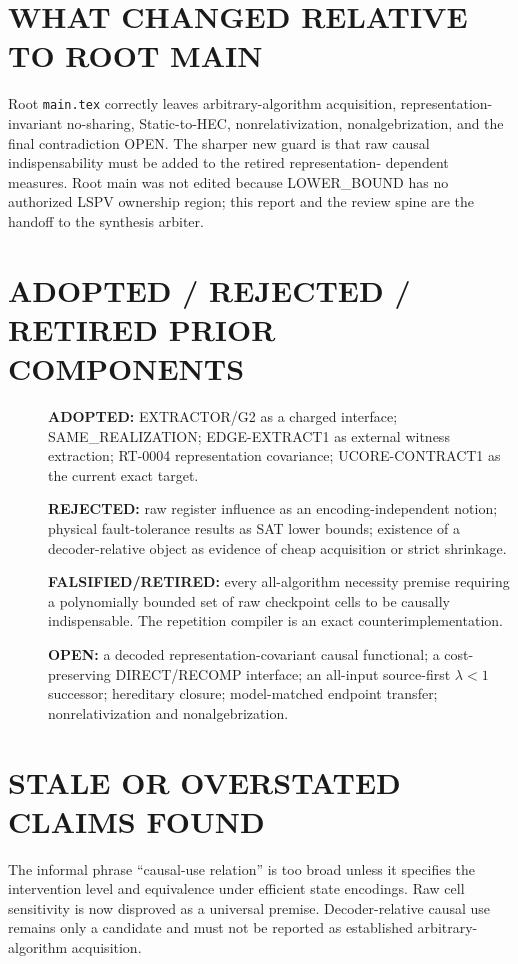 \documentclass[11pt]{article}
\begin{document}
\section{WHAT CHANGED RELATIVE TO ROOT MAIN}
Root \texttt{main.tex} correctly leaves arbitrary-algorithm acquisition,
representation-invariant no-sharing, Static-to-HEC, nonrelativization,
nonalgebrization, and the final contradiction OPEN.  The sharper new guard is
that raw causal indispensability must be added to the retired representation-
dependent measures.  Root main was not edited because LOWER\_BOUND has no
authorized LSPV ownership region; this report and the review spine are the
handoff to the synthesis arbiter.

\section{ADOPTED / REJECTED / RETIRED PRIOR COMPONENTS}
\begin{description}
\item[] \textbf{ADOPTED:} EXTRACTOR/G2 as a charged interface;
SAME\_REALIZATION; EDGE-EXTRACT1 as external witness extraction; RT-0004
representation covariance; UCORE-CONTRACT1 as the current exact target.
\item[] \textbf{REJECTED:} raw register influence as an encoding-independent
notion; physical fault-tolerance results as SAT lower bounds; existence of a
decoder-relative object as evidence of cheap acquisition or strict shrinkage.
\item[] \textbf{FALSIFIED/RETIRED:} every all-algorithm necessity premise
requiring a polynomially bounded set of raw checkpoint cells to be causally
indispensable.  The repetition compiler is an exact counterimplementation.
\item[] \textbf{OPEN:} a decoded representation-covariant causal functional;
a cost-preserving DIRECT/RECOMP interface; an all-input source-first
$\lambda<1$ successor; hereditary closure; model-matched endpoint transfer;
nonrelativization and nonalgebrization.
\end{description}

\section{STALE OR OVERSTATED CLAIMS FOUND}
The informal phrase ``causal-use relation'' is too broad unless it specifies
the intervention level and equivalence under efficient state encodings.  Raw
cell sensitivity is now disproved as a universal premise.  Decoder-relative
causal use remains only a candidate and must not be reported as established
arbitrary-algorithm acquisition.
\end{document}
